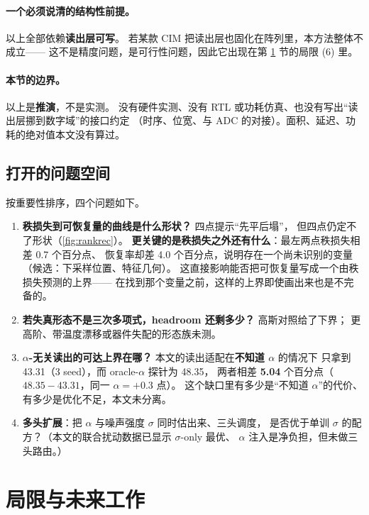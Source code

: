 \documentclass[11pt,a4paper]{ctexart}
\begin{document}
\paragraph{一个必须说清的结构性前提。}
以上全部依赖\textbf{读出层可写}。
若某款 CIM 把读出层也固化在阵列里，本方法整体不成立——
这不是精度问题，是可行性问题，因此它出现在第 \ref{sec:limit} 节的局限 (6) 里。

\paragraph{本节的边界。}
以上是\textbf{推演}，不是实测。
没有硬件实测、没有 RTL 或功耗仿真、也没有写出“读出层挪到数字域”的接口约定
（时序、位宽、与 ADC 的对接）。面积、延迟、功耗的绝对值本文没有算过。

\subsection{打开的问题空间}

按重要性排序，四个问题如下。

\begin{enumerate}[leftmargin=2em,itemsep=2pt]
  \item \textbf{秩损失到可恢复量的曲线是什么形状？} 四点提示“先平后塌”，
        但四点仍定不了形状（\cref{fig:rankrec}）。
        \textbf{更关键的是秩损失之外还有什么}：最左两点秩损失相差 0.7 个百分点、
        恢复率却差 4.0 个百分点，说明存在一个尚未识别的变量
        （候选：下采样位置、特征几何）。
        这直接影响能否把可恢复量写成一个由秩损失预测的上界——
        在找到那个变量之前，这样的上界即使画出来也是不完备的。
  \item \textbf{若失真形态不是三次多项式，headroom 还剩多少？} 高斯对照给了下界；
        更高阶、带温度漂移或器件失配的形态族未测。
  \item \textbf{$\alpha$-无关读出的可达上界在哪？} 本文的读出适配在\textbf{不知道 $\alpha$} 的情况下
        只拿到 43.31（3 seed），而 oracle-$\alpha$ 探针为 48.35，
        两者相差 \textbf{5.04} 个百分点（$48.35-43.31$，同一 $\alpha=+0.3$ 点）。
        这个缺口里有多少是“不知道 $\alpha$”的代价、有多少是优化不足，本文未分离。
  \item \textbf{多头扩展}：把 $\alpha$ 与噪声强度 $\sigma$ 同时估出来、三头调度，
        是否优于单训 $\sigma$ 的配方？（本文的联合扰动数据已显示 $\sigma$-only 最优、
        $\alpha$ 注入是净负担，但未做三头路由。）
\end{enumerate}

\section{局限与未来工作}
\label{sec:limit}
\end{document}
